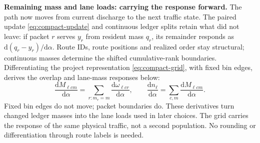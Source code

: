 \documentclass[10pt,a4paper]{article}
\newcommand{\rev}[1]{{\color{revisionred}#1}}
\begin{document}
\textbf{Remaining mass and lane loads: carrying the response forward.}
The path now moves from current discharge to the next traffic state.
The paired update \eqref{eq:compact-update} and continuous ledger splits
retain what did not leave: if packet $r$ serves $y_r$ from resident mass
$q_r$, its remainder responds as $\mathrm d(q_r-y_r)/\mathrm d\alpha$.
Route IDs, route positions and realized order stay structural; continuous
masses determine the shifted cumulative-rank boundaries.
\rev{Differentiating the project representation \eqref{eq:compact-grid}, with fixed bin edges, derives the overlap and lane-mass responses below:}
\begin{equation}
 \frac{\mathrm dM_{\ell cm}}{\mathrm d\alpha}
 =\sum_{r:m_r=m}\frac{\mathrm d\omega_{\ell cr}}{\mathrm d\alpha},
 \qquad
 \frac{\mathrm dn_\ell}{\mathrm d\alpha}
 =\sum_{c,m}\frac{\mathrm dM_{\ell cm}}{\mathrm d\alpha}.
 \label{eq:compact-grid-derivative}
\end{equation}
Fixed bin edges do not move; packet boundaries do. These derivatives
turn changed ledger masses into the lane loads used in later choices.
The grid carries the response of the same physical traffic, not a second
population. No rounding or differentiation through route labels is needed.
\end{document}
